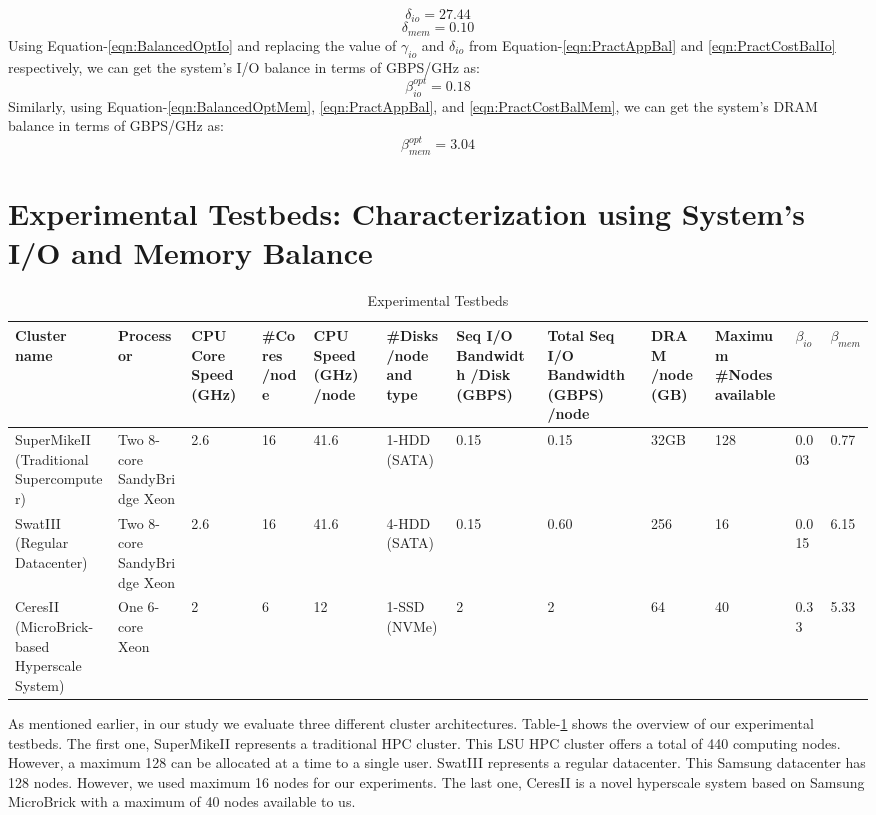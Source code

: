\documentclass[journal]{IEEEtran}
\begin{document}
\begin{equation} \label{eqn:PractCostBalIo}
\delta_{io} = 27.44 
\end{equation}
\begin{equation} \label{eqn:PractCostBalMem}
\delta_{mem} = 0.10
\end{equation}
Using Equation-\ref{eqn:BalancedOptIo} and replacing the value of $\gamma_{io}$ and $\delta_{io}$ from Equation-\ref{eqn:PractAppBal} and \ref{eqn:PractCostBalIo} respectively, we can get the system's I/O balance in terms of GBPS/GHz as:
\begin{equation} \label{eqn:PractSysBalIo}
\beta_{io}^{opt} = 0.18
\end{equation}
Similarly, using Equation-\ref{eqn:BalancedOptMem}, \ref{eqn:PractAppBal}, and \ref{eqn:PractCostBalMem}, we can get the system's DRAM balance in terms of GBPS/GHz as:
\begin{equation} \label{eqn:PractSysBalMem}
\beta_{mem}^{opt} = 3.04
\end{equation} 

\section{Experimental Testbeds: Characterization using System's I/O and Memory Balance}
\begin{table}[!t]
\caption{Experimental Testbeds}
\label{tab:Testbeds}
\centering
\begin{tabular}{|p{1.8cm}|p{2cm}|p{1cm}|p{1cm}|p{1cm}|p{1cm}|p{1cm}|p{1cm}|p{1cm}|p{1cm}|p{0.6cm}|p{0.6cm}|}
\hline
Cluster name & Processor & CPU Core Speed (GHz) & \#Cores /node & CPU Speed (GHz) /node & \#Disks /node and type & Seq I/O Bandwidth /Disk (GBPS) & Total Seq I/O Bandwidth (GBPS) /node & DRAM /node (GB) & Maximum \#Nodes available & $\beta_{io}$ & $\beta_{mem}$\\
\hline
SuperMikeII (Traditional Supercomputer) & Two 8-core SandyBridge Xeon & 2.6 & 16 & 41.6 & 1-HDD (SATA) & 0.15 & 0.15 & 32GB & 128 & 0.003 & 0.77\\
\hline
SwatIII (Regular Datacenter) & Two 8-core SandyBridge Xeon & 2.6 &  16 & 41.6 & 4-HDD (SATA) & 0.15 & 0.60 & 256 & 16 & 0.015 & 6.15\\
\hline
CeresII (MicroBrick-based Hyperscale System) & One 6-core Xeon & 2 & 6 & 12 & 1-SSD (NVMe) & 2 & 2 & 64 & 40 & 0.33 & 5.33\\
\hline
\end{tabular}
\end{table}
As mentioned earlier, in our study we evaluate three different cluster architectures. Table-\ref{tab:Testbeds} shows the overview of our experimental testbeds. The first one, SuperMikeII represents a traditional HPC cluster. This LSU HPC cluster oﬀers a total of 440 computing nodes. However, a maximum 128 can be allocated at a time to a single user. SwatIII represents a regular datacenter. This Samsung datacenter has 128 nodes. However, we used maximum 16 nodes for our experiments. The last one, CeresII is a novel hyperscale system based on Samsung MicroBrick with a maximum of 40 nodes available to us.
\end{document}
